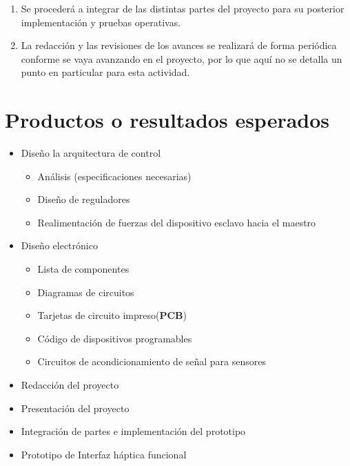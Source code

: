 \begin{enumerate}
 
  
  
  
 \item Se procederá a integrar de las distintas partes del proyecto para su posterior implementación y pruebas operativas. 
  
 \item  La redacción y las revisiones de los avances se realizará de forma periódica conforme se vaya avanzando en el proyecto, por lo que aquí no se detalla un punto en particular para esta actividad.
 \end{enumerate}





\section{Productos o resultados esperados}

\begin{itemize}
 \item Diseño  la arquitectura de control
 \begin{itemize}
  \item Análisis (especificaciones necesarias)
  \item Diseño de reguladores 
  \item Realimentación de fuerzas del dispositivo esclavo hacia el maestro

 \end{itemize}
 \item Diseño electrónico
 \begin{itemize}
  \item Lista de componentes
  \item Diagramas de circuitos
  \item Tarjetas de circuito impreso(\textbf{PCB})
  \item Código de dispositivos programables 
  \item Circuitos de acondicionamiento de señal para sensores
 \end{itemize}
 \item Redacción del proyecto
 \item Presentación del proyecto
 \item Integración de partes e implementación del prototipo
 \item Prototipo de Interfaz háptica funcional

\end{itemize}



